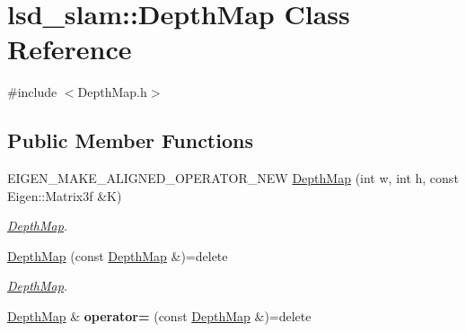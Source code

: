 \hypertarget{classlsd__slam_1_1_depth_map}{\section{lsd\-\_\-slam\-:\-:Depth\-Map Class Reference}
\label{classlsd__slam_1_1_depth_map}
}


{\ttfamily \#include $<$Depth\-Map.\-h$>$}

\subsection*{Public Member Functions}
\begin{DoxyCompactItemize}
\item 
E\-I\-G\-E\-N\-\_\-\-M\-A\-K\-E\-\_\-\-A\-L\-I\-G\-N\-E\-D\-\_\-\-O\-P\-E\-R\-A\-T\-O\-R\-\_\-\-N\-E\-W \hyperlink{classlsd__slam_1_1_depth_map_a84757cbd8120b9b460d4082a4af017bb}{Depth\-Map} (int w, int h, const Eigen\-::\-Matrix3f \&K)
\begin{DoxyCompactList}\small\item\em \hyperlink{classlsd__slam_1_1_depth_map}{Depth\-Map}. \end{DoxyCompactList}\item 
\hyperlink{classlsd__slam_1_1_depth_map_a5a048281592f3b56a1a4c5b1753cbc58}{Depth\-Map} (const \hyperlink{classlsd__slam_1_1_depth_map}{Depth\-Map} \&)=delete
\begin{DoxyCompactList}\small\item\em \hyperlink{classlsd__slam_1_1_depth_map}{Depth\-Map}. \end{DoxyCompactList}\item 
\hypertarget{classlsd__slam_1_1_depth_map_a4f37b4a200ded170eebc41b61cab79f7}{\hyperlink{classlsd__slam_1_1_depth_map}{Depth\-Map} \& {\bfseries operator=} (const \hyperlink{classlsd__slam_1_1_depth_map}{Depth\-Map} \&)=delete}\label{classlsd__slam_1_1_depth_map_a4f37b4a200ded170eebc41b61cab79f7}


\end{DoxyCompactItemize}
